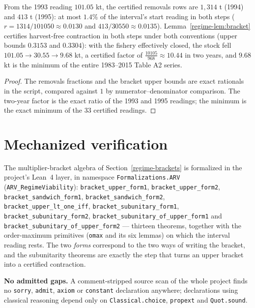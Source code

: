 \begin{proposition}
\label{regime-prop:experiment}
From the 1993 reading \(101.05\) kt, the certified removals rows are
\(1{,}314\) t (1994) and \(413\) t (1995): at most \(1.4\%\) of the
interval's start reading in both steps (\(r = 1314/101050 \approx
0.0130\) and \(413/30550 \approx 0.0135\)). Lemma~\ref{regime-lem:bracket}
certifies harvest-free contraction in both steps under both conventions
(upper bounds \(0.3153\) and \(0.3304\)): with the fishery effectively
closed, the stock fell \(101.05 \to 30.55 \to 9.68\) kt, a certified
factor of \(\tfrac{10105}{968} \approx 10.44\) in two years, and
\(9.68\) kt is the minimum of the entire 1983--2015 Table A2 series.
\end{proposition}

\begin{proof}
The removals fractions and the bracket upper bounds are exact
rationals in the script, compared against \(1\) by
numerator--denominator comparison. The two-year factor is the exact
ratio of the 1993 and 1995 readings; the minimum is the exact minimum
of the 33 certified readings.
\end{proof}

\section{Mechanized verification}
\label{regime-mech}

The multiplier-bracket algebra of Section~\ref{regime-brackets} is formalized in the project's
Lean~4 layer, in namespace \texttt{Formalizations.ARV} (\texttt{ARV\_RegimeViability}):
\texttt{bracket\_upper\_form1}, \texttt{bracket\_upper\_form2},
\texttt{bracket\_sandwich\_form1}, \texttt{bracket\_sandwich\_form2},
\texttt{bracket\_upper\_lt\_one\_iff}, \texttt{bracket\_subunitary\_form1},
\texttt{bracket\_subunitary\_form2}, \texttt{bracket\_subunitary\_of\_upper\_form1} and
\texttt{bracket\_subunitary\_of\_upper\_form2} --- thirteen theorems, together with the
order-maximum primitives (\texttt{omax} and its six lemmas) on which the interval reading
rests. The two \emph{forms} correspond to the two ways of writing the bracket, and the
subunitarity theorems are exactly the step that turns an upper bracket into a certified
contraction.

\noindent\textbf{No admitted gaps.} A comment-stripped source scan of the whole project finds
no \texttt{sorry}, \texttt{admit}, \texttt{axiom} or \texttt{constant} declaration anywhere;
declarations using classical reasoning depend only on \texttt{Classical.choice},
\texttt{propext} and \texttt{Quot.sound}.

